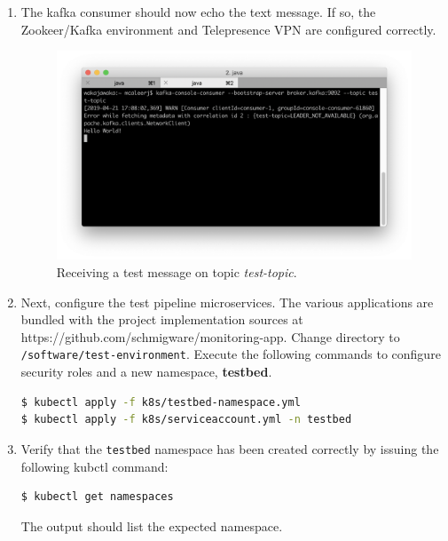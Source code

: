 \begin{enumerate}
 \item The kafka consumer should now echo the text message. If so, the Zookeer/Kafka environment and Telepresence VPN are configured correctly.

\begin{figure}[H]
	\centering  
	\includegraphics[width=\linewidth]{figures/appendixA/consume-test-message.png}
	\caption{Receiving a test message on topic \textit{test-topic}.}
\end{figure}


 \item Next, configure the test pipeline microservices. The various applications are bundled with the project implementation sources at https://github.com/schmigware/monitoring-app. Change directory to \texttt{/software/test-environment}. Execute the following commands to configure security roles and a new namespace,  \textbf{testbed}.

  \begin{lstlisting}[language=bash]
$ kubectl apply -f k8s/testbed-namespace.yml
$ kubectl apply -f k8s/serviceaccount.yml -n testbed
\end{lstlisting}

 \item Verify that the \texttt{testbed} namespace has been created correctly by issuing the following kubctl command:

\begin{lstlisting}[language=bash]
$ kubectl get namespaces
\end{lstlisting}

The output should list the expected namespace.


\end{enumerate}
